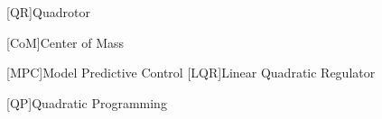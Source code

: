 
\begin{acronym}[\hspace{0.8in}] %


%	

%
%
%	

%	
%	
%
%	
%
%	
%	
%	

	[QR]{Quadrotor}

	[CoM]{Center of Mass}
	
	[MPC]{Model Predictive Control}
	[LQR]{Linear Quadratic Regulator}
	
	[QP]{Quadratic Programming}


\end{acronym}